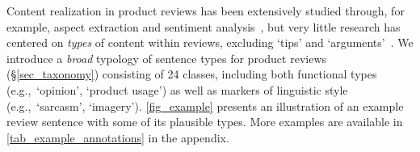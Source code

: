 


Content realization in product reviews has been extensively studied through, for example, aspect extraction and sentiment analysis~\citep{Tubishat2018aspExtr, xu2019bertSentAna}, but very little research has centered on \textit{types} of content within reviews, excluding `tips' and `arguments'~\citep{hirsch2021producttips, liu2017argsForHelpfullness}.
We introduce a \textit{broad} typology of sentence types for product reviews (\S{\ref{sec_taxonomy}}) consisting of 24 classes, including both functional types (e.g.,~`opinion', `product usage') as well as markers of linguistic style (e.g.,~`sarcasm', `imagery').
\autoref{fig_example} presents an illustration of an example review sentence with some of its plausible types.
More examples are available in \autoref{tab_example_annotations} in the appendix.



